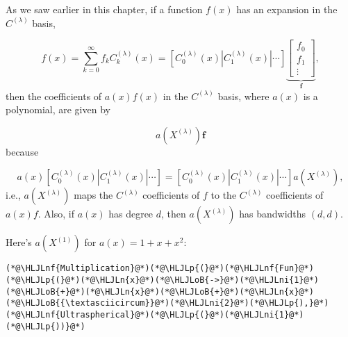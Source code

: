 \documentclass[12pt,a4paper]{article}
\newcommand{\HLJLn}[1]{#1}
\newcommand{\HLJLnf}[1]{\textcolor[RGB]{66,102,213}{#1}}
\newcommand{\HLJLni}[1]{\textcolor[RGB]{59,151,46}{#1}}
\newcommand{\HLJLoB}[1]{\textcolor[RGB]{102,102,102}{\textbf{#1}}}
\newcommand{\HLJLp}[1]{#1}
\begin{document}
As we saw earlier in this chapter, if a function $f(x)$ has an expansion in the $C^{(\lambda)}$ basis,

\[
f(x) = \sum_{k=0}^{\infty}f_kC^{(\lambda)}_k(x) = \left[ C^{(\lambda)}_0(x) | C^{(\lambda)}_1(x) | \cdots  \right]\underbrace{\begin{bmatrix}
f_0 \\
f_1 \\
\vdots
\end{bmatrix}}_{\mathbf{f}},
\]
then the coefficients of $a(x)f(x)$ in the $C^{(\lambda)}$ basis, where $a(x)$ is a polynomial, are given by

\[
a(X^{(\lambda)})\mathbf{f}
\]
because

\[
a(x)\left[ C^{(\lambda)}_0(x) | C^{(\lambda)}_1(x) | \cdots  \right] = \left[ C^{(\lambda)}_0(x) | C^{(\lambda)}_1(x) | \cdots  \right]a(X^{(\lambda)}),
\]
i.e., $a(X^{(\lambda)})$ maps the $C^{(\lambda)}$ coefficients of $f$ to the $C^{(\lambda)}$ coefficients of $a(x)f$.  Also, if $a(x)$ has degree $d$, then $a(X^{(\lambda)})$ has bandwidths $(d, d)$.

Here's $a(X^{(1)})$ for $a(x) = 1 + x + x^2$:


\begin{lstlisting}
(*@\HLJLnf{Multiplication}@*)(*@\HLJLp{(}@*)(*@\HLJLnf{Fun}@*)(*@\HLJLp{(}@*)(*@\HLJLn{x}@*)(*@\HLJLoB{->}@*)(*@\HLJLni{1}@*)(*@\HLJLoB{+}@*)(*@\HLJLn{x}@*)(*@\HLJLoB{+}@*)(*@\HLJLn{x}@*)(*@\HLJLoB{{\textasciicircum}}@*)(*@\HLJLni{2}@*)(*@\HLJLp{),}@*) (*@\HLJLnf{Ultraspherical}@*)(*@\HLJLp{(}@*)(*@\HLJLni{1}@*)(*@\HLJLp{))}@*)
\end{lstlisting}
\end{document}
